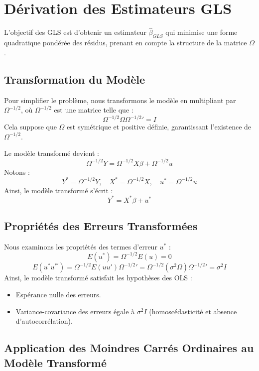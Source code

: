 \documentclass[14pt]{extarticle} %
\theoremstyle{definition}
\theoremstyle{plain}
\begin{document}
\section{Dérivation des Estimateurs GLS}

L'objectif des GLS est d'obtenir un estimateur \(\hat{\beta}_{GLS}\) qui minimise une forme quadratique pondérée des résidus, prenant en compte la structure de la matrice \( \Omega \).

\subsection{Transformation du Modèle}

Pour simplifier le problème, nous transformons le modèle en multipliant par \( \Omega^{-1/2} \), où \( \Omega^{-1/2} \) est une matrice telle que :
\[
\Omega^{-1/2} \Omega \Omega^{-1/2}' = I
\]
Cela suppose que \( \Omega \) est symétrique et positive définie, garantissant l'existence de \( \Omega^{-1/2} \).

Le modèle transformé devient :
\[
\Omega^{-1/2} Y = \Omega^{-1/2} X \beta + \Omega^{-1/2} u
\]
Notons :
\[
Y^* = \Omega^{-1/2} Y, \quad X^* = \Omega^{-1/2} X, \quad u^* = \Omega^{-1/2} u
\]
Ainsi, le modèle transformé s'écrit :
\begin{equation}
    Y^* = X^* \beta + u^*
\end{equation}

\subsection{Propriétés des Erreurs Transformées}

Nous examinons les propriétés des termes d'erreur \( u^* \) :
\[
E(u^*) = \Omega^{-1/2} E(u) = 0
\]
\[
E(u^* u^{*'}) = \Omega^{-1/2} E(u u') \Omega^{-1/2}' = \Omega^{-1/2} (\sigma^2 \Omega) \Omega^{-1/2}' = \sigma^2 I
\]
Ainsi, le modèle transformé satisfait les hypothèses des OLS :
\begin{itemize}
    \item Espérance nulle des erreurs.
    \item Variance-covariance des erreurs égale à \( \sigma^2 I \) (homoscédasticité et absence d'autocorrélation).
\end{itemize}

\subsection{Application des Moindres Carrés Ordinaires au Modèle Transformé}
\end{document}
